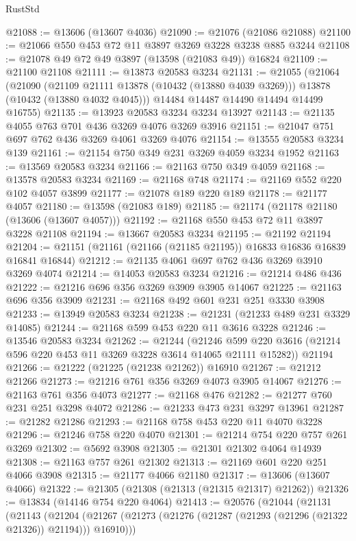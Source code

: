 \begin{lexlean}{RustStd}
\begin{coremodule}
@21088 := @13606 (@13607 @4036)
@21090 := @21076 (@21086 @21088)
@21100 := @21066 @550 @453 @72 @11 @3897 @3269 @3228 @3238 @885 @3244
@21108 := @21078 @49 @72 @49 @3897 (@13598 (@21083 @49)) @16824
@21109 := @21100 @21108
@21111 := @13873 @20583 @3234
@21131 := @21055
    (@21064
      (@21090
        (@21109 @21111 @13878 (@10432 (@13880 @4039 @3269)))
        @13878
        (@10432 (@13880 @4032 @4045)))
      @14484
      @14487
      @14490
      @14494
      @14499
      @16755)
@21135 := @13923 @20583 @3234 @3234 @13927
@21143 := @21135 @4055 @763 @701 @436 @3269 @4076 @3269 @3916
@21151 := @21047 @751 @697 @762 @436 @3269 @4061 @3269 @4076
@21154 := @13555 @20583 @3234 @139
@21161 := @21154 @750 @349 @231 @3269 @4059 @3234 @1952
@21163 := @13569 @20583 @3234
@21166 := @21163 @750 @349 @4059
@21168 := @13578 @20583 @3234
@21169 := @21168 @748
@21174 := @21169 @552 @220 @102 @4057 @3899
@21177 := @21078 @189 @220 @189
@21178 := @21177 @4057
@21180 := @13598 (@21083 @189)
@21185 := @21174 (@21178 @21180 (@13606 (@13607 @4057)))
@21192 := @21168 @550 @453 @72 @11 @3897 @3228 @21108
@21194 := @13667 @20583 @3234
@21195 := @21192 @21194
@21204 := @21151 (@21161 (@21166 (@21185 @21195)) @16833 @16836 @16839 @16841 @16844)
@21212 := @21135 @4061 @697 @762 @436 @3269 @3910 @3269 @4074
@21214 := @14053 @20583 @3234
@21216 := @21214 @486 @436
@21222 := @21216 @696 @356 @3269 @3909 @3905 @14067
@21225 := @21163 @696 @356 @3909
@21231 := @21168 @492 @601 @231 @251 @3330 @3908
@21233 := @13949 @20583 @3234
@21238 := @21231 (@21233 @489 @231 @3329 @14085)
@21244 := @21168 @599 @453 @220 @11 @3616 @3228
@21246 := @13546 @20583 @3234
@21262 := @21244
    (@21246 @599 @220 @3616 (@21214 @596 @220 @453 @11 @3269 @3228 @3614 @14065 @21111 @15282))
    @21194
@21266 := @21222 (@21225 (@21238 @21262)) @16910
@21267 := @21212 @21266
@21273 := @21216 @761 @356 @3269 @4073 @3905 @14067
@21276 := @21163 @761 @356 @4073
@21277 := @21168 @476
@21282 := @21277 @760 @231 @251 @3298 @4072
@21286 := @21233 @473 @231 @3297 @13961
@21287 := @21282 @21286
@21293 := @21168 @758 @453 @220 @11 @4070 @3228
@21296 := @21246 @758 @220 @4070
@21301 := @21214 @754 @220 @757 @261 @3269
@21302 := @5692 @3908
@21305 := @21301 @21302 @4064 @14939
@21308 := @21163 @757 @261 @21302
@21313 := @21169 @601 @220 @251 @4066 @3908
@21315 := @21177 @4066 @21180
@21317 := @13606 (@13607 @4066)
@21322 := @21305 (@21308 (@21313 (@21315 @21317) @21262))
@21326 := @13834 (@14146 @754 @220 @4064)
@21413 := @20576
    (@21044
      (@21131
        (@21143
          (@21204
            (@21267 (@21273 (@21276 (@21287 (@21293 (@21296 (@21322 @21326)) @21194))) @16910)))

\end{coremodule}
\end{lexlean}

